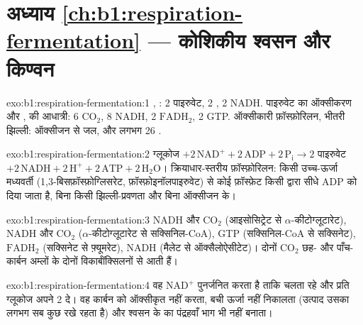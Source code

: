 \section*{अध्याय \ref{ch:b1:respiration-fermentation} --- कोशिकीय श्वसन और किण्वन}

\begin{solution}{exo:b1:respiration-fermentation:1}
, : 2 पाइरुवेट, 2 , 2 NADH. पाइरुवेट का
ऑक्सीकरण और ,  की आधात्री: 6 $\mathrm{CO_2}$, 8 NADH, 2
$\mathrm{FADH_2}$, 2 GTP. ऑक्सीकारी फ़ॉस्फ़ोरिलन, भीतरी झिल्ली:
ऑक्सीजन से जल, और लगभग 26 .
\end{solution}

\begin{solution}{exo:b1:respiration-fermentation:2}
ग्लूकोज $+ 2\,\mathrm{NAD^+} + 2\,\mathrm{ADP} + 2\,\mathrm{P_i} \to
2$ पाइरुवेट $+ 2\,\mathrm{NADH} + 2\,\mathrm{H^+} + 2\,\mathrm{ATP} +
2\,\mathrm{H_2O}$। क्रियाधार-स्तरीय फ़ॉस्फ़ोरिलन: किसी
उच्च-ऊर्जा मध्यवर्ती (1,3-बिसफ़ॉस्फ़ोग्लिसरेट, फ़ॉस्फ़ोइनॉलपाइरुवेट) से
कोई फ़ॉस्फ़ेट किसी  द्वारा सीधे ADP को दिया जाता है,
बिना किसी झिल्ली-प्रवणता और बिना ऑक्सीजन के।
\end{solution}

\begin{solution}{exo:b1:respiration-fermentation:3}
NADH और $\mathrm{CO_2}$ (आइसोसिट्रेट से $\alpha$-कीटोग्लूटारेट), NADH
और $\mathrm{CO_2}$ ($\alpha$-कीटोग्लूटारेट से सक्सिनिल-CoA), GTP
(सक्सिनिल-CoA से सक्सिनेट), $\mathrm{FADH_2}$ (सक्सिनेट से फ़्यूमरेट),
NADH (मैलेट से ऑक्सैलोऐसीटेट)। दोनों $\mathrm{CO_2}$ छह- और
पाँच-कार्बन अम्लों के दोनों विकार्बॉक्सिलनों से आती हैं।
\end{solution}

\begin{solution}{exo:b1:respiration-fermentation:4}
वह $\mathrm{NAD^+}$ पुनर्जनित करता है ताकि  चलता रहे और
प्रति ग्लूकोज अपने 2  दे। वह कार्बन को ऑक्सीकृत नहीं करता, बची ऊर्जा
नहीं निकालता (उत्पाद उसका लगभग सब कुछ रखे रहता है) और श्वसन के  का
पंद्रहवाँ भाग भी नहीं बनाता।
\end{solution}

